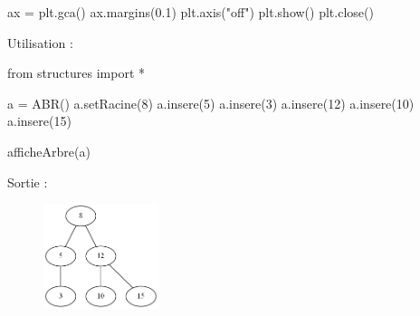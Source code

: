\documentclass[
  letterpaper,
  DIV=11,
  numbers=noendperiod]{scrartcl}
\newenvironment{Shaded}{\begin{snugshade}}{\end{snugshade}}
\newcommand{\DecValTok}[1]{\textcolor[rgb]{0.68,0.00,0.00}{#1}}
\newcommand{\FloatTok}[1]{\textcolor[rgb]{0.68,0.00,0.00}{#1}}
\newcommand{\ImportTok}[1]{\textcolor[rgb]{0.00,0.46,0.62}{#1}}
\newcommand{\NormalTok}[1]{\textcolor[rgb]{0.00,0.23,0.31}{#1}}
\newcommand{\OperatorTok}[1]{\textcolor[rgb]{0.37,0.37,0.37}{#1}}
\newcommand{\StringTok}[1]{\textcolor[rgb]{0.13,0.47,0.30}{#1}}
\begin{document}
\begin{tcolorbox}
\begin{Shaded}
\begin{Highlighting}[]
\NormalTok{ax }\OperatorTok{=}\NormalTok{ plt.gca()}
\NormalTok{ax.margins(}\FloatTok{0.1}\NormalTok{)}
\NormalTok{plt.axis(}\StringTok{"off"}\NormalTok{)}
\NormalTok{plt.show()}
\NormalTok{plt.close()}
\end{Highlighting}
\end{Shaded}

Utilisation :

\begin{Shaded}
\begin{Highlighting}[]
\ImportTok{from}\NormalTok{ structures }\ImportTok{import} \OperatorTok{*}

\NormalTok{a }\OperatorTok{=}\NormalTok{ ABR()}
\NormalTok{a.setRacine(}\DecValTok{8}\NormalTok{)}
\NormalTok{a.insere(}\DecValTok{5}\NormalTok{)}
\NormalTok{a.insere(}\DecValTok{3}\NormalTok{)}
\NormalTok{a.insere(}\DecValTok{12}\NormalTok{)}
\NormalTok{a.insere(}\DecValTok{10}\NormalTok{)}
\NormalTok{a.insere(}\DecValTok{15}\NormalTok{)}

\NormalTok{afficheArbre(a)}
\end{Highlighting}
\end{Shaded}

Sortie :

\begin{figure}[H]

{\centering \includegraphics[width=0.3\textwidth,height=\textheight]{arbre.gv.png}

}

\end{figure}

\end{tcolorbox}
\end{document}
